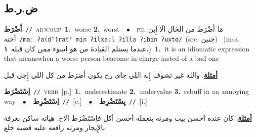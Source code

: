 \documentclass[10pt,a4paper,twoside]{article} %
\begin{document}
\begin{multicols}{2}
\vspace{-3mm}
\subsection*{\color{blue}\foreignlanguage{arabic}{ض.ر.ط}\color{blue}{}} 

{\setlength\topsep{0pt}\textbf{\foreignlanguage{arabic}{أَضْرَط}}\ {\color{gray}\texttt{//}\color{black}}\ \textsc{adj\textunderscore comp}\ \textbf{1.}~worse  \textbf{2.}~worst\ \ $\bullet$\ \ \textsc{ph.} \color{gray} \foreignlanguage{arabic}{مَا أَضْرَط من الخَال الَا إِبن أخته}\color{black}\ {\color{gray}\texttt{/{\sffamily maː ʔa(dˤ)ratˤ min ʔilxaːl ʔilla ʔibin ʔuxto}/}\color{black}}\ \color{gray}(src. \foreignlanguage{arabic}{جنين})\color{black}\ \color{gray} (msa. \foreignlanguage{arabic}{عندما يستلم القيادة من هو اسوء ممن كان قبله}~\foreignlanguage{arabic}{\textbf{١.}})\color{black}\ \textbf{1.}~it is an idiomatic expression that meanswhen a worse person beacome in charge insted of a bad one\  \begin{flushright}\color{gray}\foreignlanguage{arabic}{\textbf{\underline{\foreignlanguage{arabic}{أمثلة}}}: والله غير تشوف إِنه اللي جاي رح يكون أَضرَط من كل اللي إِجى قبل}\end{flushright}\color{black}} \vspace{2mm}

{\setlength\topsep{0pt}\textbf{\foreignlanguage{arabic}{اِسْتَضْرَط}}\ {\color{gray}\texttt{//}\color{black}}\ \textsc{verb}\ [p.]\ \textbf{1.}~underestimate  \textbf{2.}~undervalue  \textbf{3.}~rebuff in an annoying way\ \ $\bullet$\ \ \setlength\topsep{0pt}\textbf{\foreignlanguage{arabic}{اِسْتَضْرِط}}\ {\color{gray}\texttt{//}\color{black}}\ [c.]\ \ $\bullet$\ \ \setlength\topsep{0pt}\textbf{\foreignlanguage{arabic}{يِسْتَضْرِط}}\ {\color{gray}\texttt{//}\color{black}}\ [i.]\  \begin{flushright}\color{gray}\foreignlanguage{arabic}{\textbf{\underline{\foreignlanguage{arabic}{أمثلة}}}: كان عنده أحسن بيت ومرته بتعمله أحسن أكل فاِسْتَضْرَط الاخ. هياته ساكن بغرفة بالإِيجار ومرته رافعة عليه قضية خلع.}\end{flushright}\color{black}} \vspace{2mm}


\end{multicols}
\end{document}

